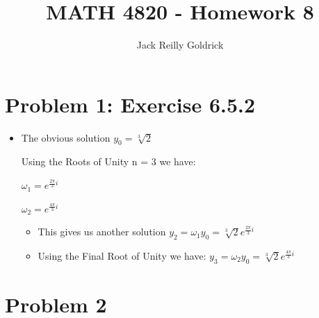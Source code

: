 \documentclass[]{report}
\title{MATH 4820 - Homework 8}
\author{Jack Reilly Goldrick}
\begin{document}
	\maketitle
	
	
	\section{Problem 1:  Exercise 6.5.2}
	
	
	\begin{itemize}
		\item The obvious solution $y_0 = \sqrt[3]{2}$
		
			 Using the Roots of Unity  n = 3 we have:
				
				  $\omega_{1} = e^{\frac{2 \pi}{3} i} $
				

				
				  $\omega_{2} = e^{\frac{4 \pi}{3} i} $
				
			\begin{itemize}
				\item This gives us another solution $y_2  = \omega_{1} y_0 = \sqrt[3]{2} e^{\frac{2 \pi}{3} i}$
				
				\item Using the Final Root of Unity we have:  $y_3  = \omega_{2} y_0 = \sqrt[3]{2} e^{\frac{4 \pi}{3} i}$
			\end{itemize}
			
	\end{itemize}
	
	
	
	
	\section{Problem 2}
	
\end{document}
